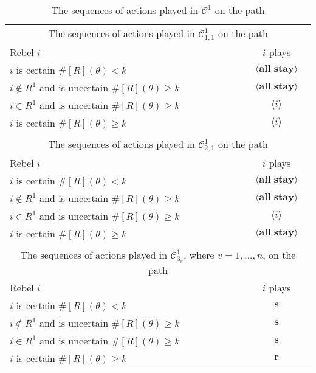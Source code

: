 \documentclass[12pt,letter]{article}
\newcommand{\Kappa}{\mathcal{C}}
\theoremstyle{definition}
\theoremstyle{remark}
\theoremstyle{claim}
\begin{document}
\begin{table}[!htbp]
\caption{The sequences of actions played in $\Kappa^1$ on the path}
\label{Table_cd0}
\begin{center}
\begin{tabular}{l c}
\multicolumn{2}{c}{The sequences of actions played in $\Kappa^1_{1,1}$ on the path}\\
Rebel $i$ 	 	&  	$i$ plays		 \\
\hline
\hline
$i$ is certain $\#[R](\theta)<k$ 	& 	$\langle \textbf{all stay} \rangle$	\\
$i\notin R^{1}$ and is uncertain $\#[R](\theta)\geq k$	& 	$\langle \textbf{all stay} \rangle$	\\
$i\in R^{1}$ and is uncertain $\#[R](\theta)\geq k$ &  $\langle i \rangle$  \\
$i$ is certain $\#[R](\theta)\geq k$ &  $\langle i \rangle$  \\
\hline
\\
\multicolumn{2}{c}{The sequences of actions played in $\Kappa^1_{2,1}$ on the path}\\
Rebel $i$ 	 	&  	$i$ plays		 \\
\hline
\hline
$i$ is certain $\#[R](\theta)<k$ 	& 	$\langle \textbf{all stay} \rangle$	\\
$i\notin R^{1}$ and is uncertain $\#[R](\theta)\geq k$	& 	$\langle \textbf{all stay} \rangle$	\\
$i\in R^{1}$ and is uncertain $\#[R](\theta)\geq k$ &  $\langle i \rangle$  \\
$i$ is certain $\#[R](\theta)\geq k$ &  $\langle \textbf{all stay} \rangle$  \\
\hline
\\
\multicolumn{2}{c}{The sequences of actions played in $\Kappa^1_{3_v}$, where $v=1,...,n$, on the path}\\
Rebel $i$ 	 	&  	$i$ plays		 \\
\hline
\hline
$i$ is certain $\#[R](\theta)<k$ 	& 	$ \textbf{s} $	\\
$i\notin R^{1}$ and is uncertain $\#[R](\theta)\geq k$	& 	$ \textbf{s} $	\\
$i\in R^{1}$ and is uncertain $\#[R](\theta)\geq k$ &  $ \textbf{s} $  \\
$i$ is certain $\#[R](\theta)\geq k$ &  $ \textbf{r} $  \\
\hline
\end{tabular}
\end{center}
\end{table}
\end{document}
